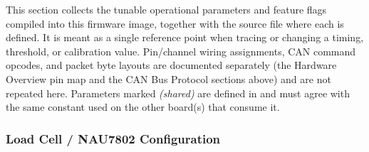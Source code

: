﻿\documentclass[11pt,letterpaper]{article}
\begin{document}
This section collects the tunable operational parameters and feature flags
compiled into this firmware image, together with the source file where each
is defined. It is meant as a single reference point when tracing or changing
a timing, threshold, or calibration value. Pin/channel wiring assignments,
CAN command opcodes, and packet byte layouts are documented separately (the
Hardware Overview pin map and the CAN Bus Protocol sections above) and are
not repeated here. Parameters marked \emph{(shared)} are defined in
 and must agree with the same constant used on
the other board(s) that consume it.

\subsubsection*{Load Cell / NAU7802 Configuration}
\end{document}
